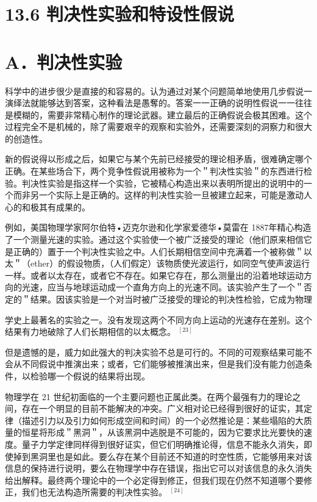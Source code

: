 \section*{13.6 判决性实验和特设性假说}
\section*{A．判决性实验}
科学中的进步很少是直接的和容易的。认为通过对某个问题简单地使用几步假说一演绎法就能够达到答案，这种看法是愚奪的。答案一一正确的说明性假说一一往往是模糊的，需要非常精心制作的理论武器。建立最后的正确假说会极其困难。这个过程完全不是机械的，除了需要艰辛的观察和实验外，还需要深刻的洞察力和很大的创造性。

新的假说得以形成之后，如果它与某个先前已经接受的理论相矛盾，很难确定哪个正确。在某些场合下，两个竞争性假说用被称为一个＂判决性实验＂的东西进行检验。判决性实验是指这样一个实验，它被精心构造出来以表明所提出的说明中的一个而非另一个实际上是正确的。这样的判决性实验一旦被建立起来，可能是激动人心的和极其有成果的。

例如，美国物理学家阿尔伯特•迈克尔逊和化学家爱德华•莫雷在 1887年精心构造了一个测量光速的实验。通过这个实验使一个被广泛接受的理论（他们原来相信它是正确的）置于一个判决性实验之中。人们长期相信空间中充满着一个被称做＂以太＂（ether）的假设物质，（人们假定）该物质使光波运行，如同空气使声波运行一样。或者以太存在，或者它不存在。如果它存在，那么测量出的沿着地球运动方向的光速，应当与地球运动成一个直角方向上的光速不同。该实验产生了一个＂否定的＂结果。因该实验是一个对当时被广泛接受的理论的判决性检验，它成为物理

学史上最著名的实验之一。没有发现这两个不同方向上运动的光速存在差别。这个结果有力地破除了人们长期相信的以太概念。 ${ }^{[23]}$

但是遗憾的是，威力如此强大的判决实验不总是可行的。不同的可观察结果可能不会从不同假说中推演出来；或者，它们能够被推演出来，但是我们没有能力创造条件，以检验哪一个假说的结果将出现。

物理学在 21 世纪初面临的一个主要问题也正属此类。在两个最强有力的理论之间，存在一个明显的目前不能解决的冲突。广义相对论已经得到很好的证实，其定律（描述引力以及引力如何形成空间和时间）的一个必然推论是：某些塌陷的大质量的恒星将形成＂黑洞＂，从该黑洞中逃脱是不可能的，因为它要求比光要快的速度。量子力学定律同样得到很好证实，但它们明确推论得，信息不能永久消失，即使掉到黑洞里也是如此。要么存在某个目前还不知道的时空性质，它能够用来对该信息的保持进行说明，要么在物理学中存在错误，指出它可以对该信息的永久消失给出解释。最终两个理论中的一个必定得到修正，但我们现在仍然不知道哪个要修正，我们也无法构造所需要的判决性实验。 ${ }^{[24]}$

